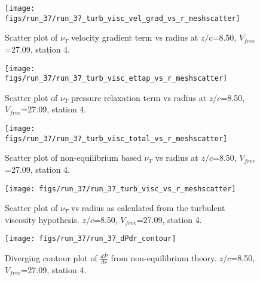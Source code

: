 \begin{figure}[H]
\centering
\texttt{[image: figs/run\_37/run\_37\_turb\_visc\_vel\_grad\_vs\_r\_meshscatter]}
\caption{Scatter plot of $\nu_T$ velocity gradient term vs radius at $z/c$=8.50, $V_{free}$=27.09, station 4.}
\end{figure}


\begin{figure}[H]
\centering
\texttt{[image: figs/run\_37/run\_37\_turb\_visc\_ettap\_vs\_r\_meshscatter]}
\caption{Scatter plot of $\nu_T$ pressure relaxation term vs radius at $z/c$=8.50, $V_{free}$=27.09, station 4.}
\end{figure}


\begin{figure}[H]
\centering
\texttt{[image: figs/run\_37/run\_37\_turb\_visc\_total\_vs\_r\_meshscatter]}
\caption{Scatter plot of non-equilibrium based $\nu_T$ vs radius at $z/c$=8.50, $V_{free}$=27.09, station 4.}
\end{figure}


\begin{figure}[H]
\centering
\texttt{[image: figs/run\_37/run\_37\_turb\_visc\_vs\_r\_meshscatter]}
\caption{Scatter plot of $\nu_T$ vs radius as calculated from the turbulent viscosity hypothesis. $z/c$=8.50, $V_{free}$=27.09, station 4.}
\end{figure}


\begin{figure}[H]
\centering
\texttt{[image: figs/run\_37/run\_37\_dPdr\_contour]}
\caption{Diverging contour plot of $\frac{d\bar{P}}{dr}$ from non-equilibrium theory. $z/c$=8.50, $V_{free}$=27.09, station 4.}
\end{figure}


